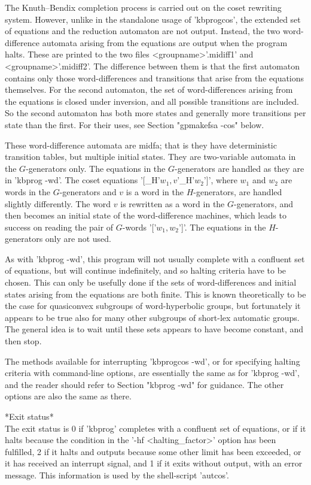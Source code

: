 The Knuth--Bendix completion process is carried out on the coset rewriting
system.
However, unlike in the standalone usage of 'kbprogcos', the extended set of
equations and the reduction automaton are not output. Instead, the two
word-difference automata arising from the equations are output when the program
halts. These are printed to the two files <groupname>'.midiff1' and
<groupname>'.midiff2'. The difference between them is that the first automaton
contains only those word-differences and transitions that arise from the
equations themselves. For the second automaton, the set of word-differences
arising from the equations is closed under inversion, and all possible
transitions are included. So the second automaton has both more states and
generally more transitions per state than the first. For their uses, see
Section "gpmakefsa -cos" below.

These word-difference automata are midfa; that is they have deterministic
transition tables, but multiple initial states. They are two-variable automata
in the $G$-generators only. The equations in the $G$-generators are
handled as they are in 'kbprog -wd'. The coset equations
'[\_H'$w_1,v$'\_H'$w_2$']', where $w_1$ and $w_2$ are words in the
$G$-generators and $v$ is a word in the $H$-generators, are handled slightly
differently. The word $v$ is rewritten as a word in the $G$-generators, and
then becomes an initial state of the word-difference machines, which leads
to success on reading the pair of $G$-words '['$w_1,w_2$']'. The equations
in the $H$-generators only are not used. 

As with 'kbprog -wd', this program will not usually complete with a
confluent set of equations, but will continue indefinitely, and so halting
criteria have to be chosen. This can only be usefully done if the sets of
word-differences and initial states arising from the equations are both
finite. This is known theoretically to be the case for quasiconvex subgroups
of word-hyperbolic groups, but fortunately it appears to be true also
for many other subgroups of short-lex automatic groups.
The general idea is to wait until these sets appears to have become constant,
and then stop.

The methods available for interrupting 'kbprogcos -wd', or for specifying
halting criteria with command-line options, are essentially the same as for
'kbprog -wd', and the reader should refer to Section "kbprog -wd" for guidance.
The other options are also the same as there.

*Exit status*\\
The exit status is 0 if 'kbprog' completes with a confluent set of equations,
or if it halts because the condition in the '-hf <halting\_factor>' option
has been fulfilled,
2 if it halts and outputs because some other limit has
been exceeded, or it has received an interrupt signal, and 1 if it exits
without output, with an error message.
This information is used by the shell-script 'autcos'.

